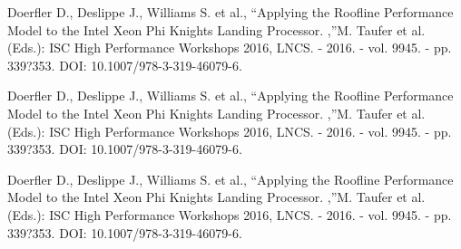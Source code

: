 \documentclass[
11pt,%
tightenlines,%
twoside,%
onecolumn,%
nofloats,%
nobibnotes,%
nofootinbib,%
superscriptaddress,%
noshowpacs,%
centertags]%
{revtex4}
\begin{document}
\begin{thebibliography}{99}
Doerfler D., Deslippe J., Williams S. et al., \textquotedblleft Applying the Roofline Performance Model to the Intel Xeon Phi Knights Landing Processor. ,\textquotedblright M. Taufer et al. (Eds.): ISC High Performance Workshops 2016, LNCS. - 2016. - vol. 9945. - pp. 339?353. DOI: 10.1007/978-3-319-46079-6.

Doerfler D., Deslippe J., Williams S. et al., \textquotedblleft Applying the Roofline Performance Model to the Intel Xeon Phi Knights Landing Processor. ,\textquotedblright M. Taufer et al. (Eds.): ISC High Performance Workshops 2016, LNCS. - 2016. - vol. 9945. - pp. 339?353. DOI: 10.1007/978-3-319-46079-6.

Doerfler D., Deslippe J., Williams S. et al., \textquotedblleft Applying the Roofline Performance Model to the Intel Xeon Phi Knights Landing Processor. ,\textquotedblright M. Taufer et al. (Eds.): ISC High Performance Workshops 2016, LNCS. - 2016. - vol. 9945. - pp. 339?353. DOI: 10.1007/978-3-319-46079-6.

\end{thebibliography}
\end{document}
